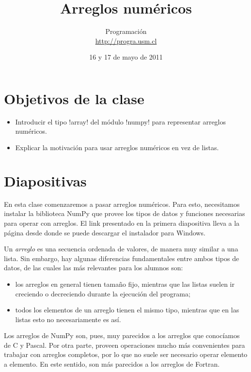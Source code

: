 \documentclass[10pt]{article}
\title{Arreglos numéricos}
\author{Programación \\ \url{http://progra.usm.cl}}
\date{16 y 17 de mayo de 2011}
\begin{document}
  \maketitle

  \section*{Objetivos de la clase}
  \begin{itemize}
    \item Introducir el tipo \li!array!
      del módulo \li!numpy!
      para representar arreglos numéricos.
    \item Explicar la motivación
      para usar arreglos numéricos
      en vez de listas.
  \end{itemize}

  \section*{Diapositivas}


  En esta clase
  comenzaremos a pasar arreglos numéricos.
  Para esto,
  necesitamos instalar la biblioteca NumPy
  que provee los tipos de datos y funciones
  necesarias para operar con arreglos.
  El link presentado en la primera diapositiva
  lleva a la página desde donde se puede descargar
  el instalador para Windows.

  Un \emph{arreglo}
  es una secuencia ordenada de valores,
  de manera muy similar a una lista.
  Sin embargo,
  hay algunas diferencias fundamentales
  entre ambos tipos de datos,
  de las cuales las más relevantes
  para los alumnos son:
  \begin{itemize}
    \item los arreglos en general tienen tamaño fijo,
      mientras que las listas suelen ir creciendo
      o decreciendo durante la ejecución del programa;
    \item todos los elementos de un arreglo
      tienen el mismo tipo, mientras que en las listas
      esto no necesariamente es así.
  \end{itemize}

  Los arreglos de NumPy son, pues,
  muy parecidos a los arreglos que conocíamos
  de C y Pascal.
  Por otra parte,
  proveen operaciones mucho más convenientes
  para trabajar con arreglos completos,
  por lo que no suele ser necesario
  operar elemento a elemento.
  En este sentido,
  son más parecidos a los arreglos de Fortran.
\end{document}
